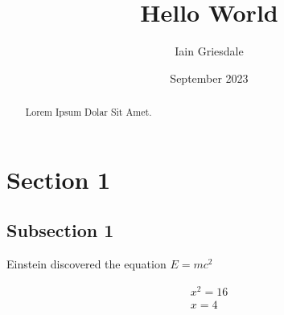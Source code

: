 \documentclass[titlepage]{article}
\title{Hello World}
\author{Iain Griesdale}
\date{September 2023}
\begin{document}
\maketitle

\begin{abstract}
    Lorem Ipsum Dolar Sit Amet.
\end{abstract}

\section{Section 1}

\subsection{Subsection 1}

Einstein discovered the equation $E=mc^2$

\begin{equation} 
    \begin{split}
        x^2=16 \\
        x=4
    \end{split}
    
\end{equation}
\end{document}
